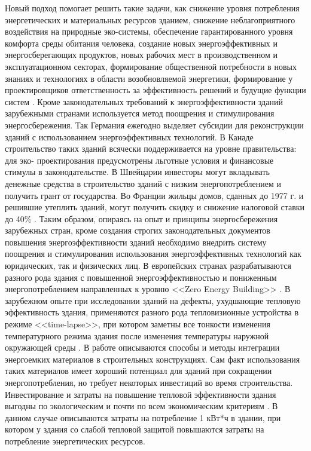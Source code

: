 Новый подход помогает решить такие задачи, как снижение уровня потребления энергетических и материальных ресурсов зданием,
снижение неблагоприятного воздействия на природные эко-системы, обеспечение гарантированного уровня комфорта среды обитания человека,
создание новых энергоэффективных и энергосберегающих продуктов, новых рабочих мест в производственном и эксплуатационном секторах,
формирование общественной потребности в новых знаниях и технологиях в области возобновляемой энергетики, формирование у проектировщиков ответственность за
эффективность решений и будущие функции систем \Code{[6]}.
Кроме законодательных требований к энергоэффективности зданий зарубежными странами используется метод поощрения и стимулирования энергосбережения.
Так Германия ежегодно выделяет субсидии для реконструкции зданий с использованием энергоэффективных технологий.
В Канаде строительство таких зданий всячески поддерживается на уровне правительства: для эко- проектирования предусмотрены льготные условия и финансовые стимулы в законодательстве.
В Швейцарии инвесторы могут вкладывать денежные средства в строительство зданий с низким энергопотреблением и получить грант от государства.
Во Франции жильцы домов, сданных до 1977 г. и решившие утеплить зданий, могут получить скидку и снижение налоговой ставки до 40\% \Code{[7]}.
Таким образом, опираясь на опыт и принципы энергосбережения зарубежных стран, кроме создания строгих законодательных документов повышения энергоэффективности зданий необходимо внедрить систему поощрения и стимулирования использования энергоэффективных технологий как юридических, так и физических лиц.
В европейских странах разрабатываются разного рода здания с повышенной энергоэффективностью и пониженным энергопотреблением направленных к уровню <<Zero Energy Building>> \Code{[8]}.
В зарубежном опыте при исследовании зданий на дефекты, ухудшающие тепловую эффективность здания, применяются разного рода тепловизионные устройства в режиме <<time-lapse>>,
при котором заметны все тонкости изменения температурного режима здания после изменения температуры наружной окружающей среды \Code{[9, 10]}.
В работе \Code{[11]} описываются способы и методы интеграции энергоемких материалов в строительных конструкциях.
Сам факт использования таких материалов имеет хороший потенциал для зданий при сокращении энергопотребления, но требует некоторых инвестиций во время строительства. Инвестирование и затраты на повышение тепловой эффективности здания выгодны по экологическим и почти по всем экономическим критериям \Code{[12]}. В данном случае описываются затраты на потребление 1 кВт*ч в здании, при котором у здания со слабой тепловой защитой повышаются затраты на потребление энергетических ресурсов. 
